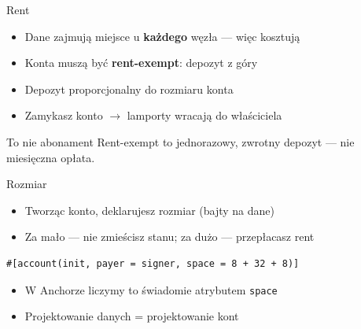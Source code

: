 \begin{frame}{Rent}
  \begin{itemize}
    \item Dane zajmują miejsce u \textbf{każdego} węzła --- więc kosztują
    \item Konta muszą być \textbf{rent-exempt}: depozyt z góry
    \item Depozyt proporcjonalny do rozmiaru konta
    \item Zamykasz konto $\to$ lamporty wracają do właściciela
  \end{itemize}
  \vspace{0.2cm}
  \begin{exampleblock}{To nie abonament}
    Rent-exempt to jednorazowy, zwrotny depozyt --- nie miesięczna opłata.
  \end{exampleblock}
\end{frame}

\begin{frame}[fragile]{Rozmiar}
  \begin{itemize}
    \item Tworząc konto, deklarujesz rozmiar (bajty na dane)
    \item Za mało --- nie zmieścisz stanu; za dużo --- przepłacasz rent
  \end{itemize}
\begin{lstlisting}
#[account(init, payer = signer, space = 8 + 32 + 8)]
\end{lstlisting}
  \begin{center}
  \end{center}
  \begin{itemize}
    \item W Anchorze liczymy to świadomie atrybutem \texttt{space}
    \item Projektowanie danych = projektowanie kont
  \end{itemize}
\end{frame}


